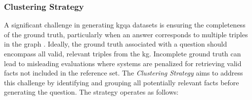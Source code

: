 \subsubsection{Clustering Strategy}
A significant challenge in generating \gls{kgqa} datasets is ensuring the completeness of the ground truth, particularly when an answer corresponds to multiple triples in the graph \cite{steinmetz_what_2021}. Ideally, the ground truth associated with a question should encompass all valid, relevant triples from the \gls{kg}. Incomplete ground truth can lead to misleading evaluations where systems are penalized for retrieving valid facts not included in the reference set. The \emph{Clustering Strategy} aims to address this challenge by identifying and grouping all potentially relevant facts before generating the question. The strategy operates as follows:

